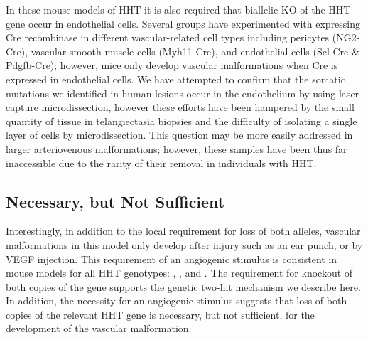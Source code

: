 	In these mouse models of HHT it is also required that biallelic KO of the HHT gene occur in endothelial cells. Several groups have experimented with expressing Cre recombinase in different vascular-related cell types including pericytes (NG2-Cre), vascular smooth muscle cells (Myh11-Cre), and endothelial cells (Scl-Cre \& Pdgfb-Cre); however, mice only develop vascular malformations when Cre is expressed in endothelial cells.\citep{tualchalot2015, choi2014, garridomartin2014, mahmoud2010} We have attempted to confirm that the somatic mutations we identified in human lesions occur in the endothelium by using laser capture microdissection, however these efforts have been hampered by the small quantity of tissue in telangiectasia biopsies and the difficulty of isolating a single layer of cells by microdissection. This question may be more easily addressed in larger arteriovenous malformations; however, these samples have been thus far inaccessible due to the rarity of their removal in individuals with HHT.
	
\subsection{Necessary, but Not Sufficient}
Interestingly, in addition to the local requirement for loss of both alleles, vascular malformations in this model only develop after injury such as an ear punch, or by VEGF injection.\citep{choi2012} This requirement of an angiogenic stimulus is consistent in mouse models for all HHT genotypes: , , and .\citep{kim2018} The requirement for knockout of both copies of the gene supports the genetic two-hit mechanism we describe here. In addition, the necessity for an angiogenic stimulus suggests that loss of both copies of the relevant HHT gene is necessary, but not sufficient, for the development of the vascular malformation. 


